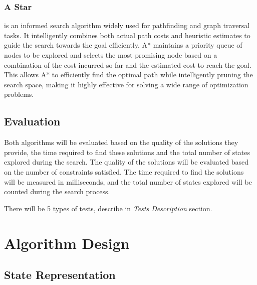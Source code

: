 \documentclass[runningheads]{paper}
\begin{document}
\subsubsection{A Star}
is an informed search algorithm widely used for pathfinding and graph 
traversal tasks. It intelligently combines both actual path costs and heuristic 
estimates to guide the search towards the goal efficiently. A* maintains a 
priority queue of nodes to be explored and selects the most promising node 
based on a combination of the cost incurred so far and the estimated cost to 
reach the goal. This allows A* to efficiently find the optimal path while 
intelligently pruning the search space, making it highly effective for solving 
a wide range of optimization problems.


\subsection{Evaluation}
\quad Both algorithms will be evaluated based on the quality of the solutions they
provide, the time required to find these solutions and the total number of
states explored during the search. The quality of the solutions will be
evaluated based on the number of constraints satisfied.  The time required to 
find the solutions will be measured in milliseconds, and the total number of
states explored will be counted during the search process.

There will be 5 types of tests, describe in \textit{Tests Description} section.

\section{Algorithm Design}
\subsection{State Representation}
\end{document}
